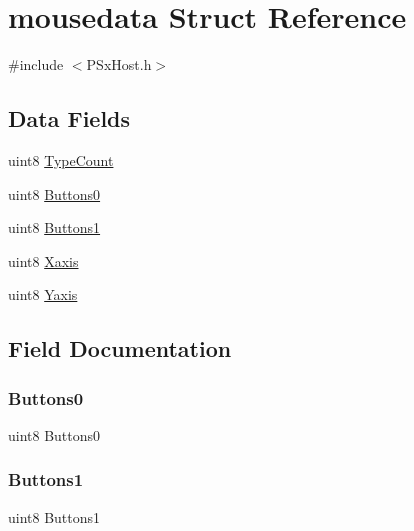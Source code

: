 \hypertarget{structmousedata}{}\section{mousedata Struct Reference}
\label{structmousedata}


{\ttfamily \#include $<$P\+Sx\+Host.\+h$>$}

\subsection*{Data Fields}
\begin{DoxyCompactItemize}
\item 
uint8 \mbox{\hyperlink{structmousedata_af8950e4872b4b4b5dd2b837ac45a0603}{Type\+Count}}
\item 
uint8 \mbox{\hyperlink{structmousedata_a0d9f38dcaa6d84c7fc78d434b839f259}{Buttons0}}
\item 
uint8 \mbox{\hyperlink{structmousedata_a17ebb8fd1844de7d6545c9f96194d300}{Buttons1}}
\item 
uint8 \mbox{\hyperlink{structmousedata_aff6318c800e37a88edd40b023338c7b1}{Xaxis}}
\item 
uint8 \mbox{\hyperlink{structmousedata_aba64dcb47ad58c7e914fc0a6093bc229}{Yaxis}}
\end{DoxyCompactItemize}


\subsection{Field Documentation}
\mbox{\label{structmousedata_a0d9f38dcaa6d84c7fc78d434b839f259}} 
\subsubsection{\texorpdfstring{Buttons0}{Buttons0}}
{\footnotesize\ttfamily uint8 Buttons0}

\mbox{\label{structmousedata_a17ebb8fd1844de7d6545c9f96194d300}} 
\subsubsection{\texorpdfstring{Buttons1}{Buttons1}}
{\footnotesize\ttfamily uint8 Buttons1}

